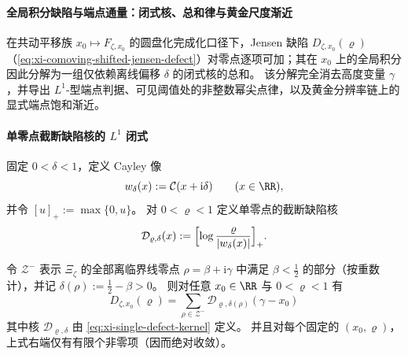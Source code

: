 \paragraph{全局积分缺陷与端点通量：闭式核、总和律与黄金尺度渐近}\label{par:xi-comoving-integrated-jensen-defect-sumrule}
在共动平移族 \(x_0\mapsto F_{\zeta,x_0}\) 的圆盘化完成化口径下，Jensen 缺陷 \(D_{\zeta,x_0}(\varrho)\)（\eqref{eq:xi-comoving-shifted-jensen-defect}）对零点逐项可加；其在 \(x_0\) 上的全局积分因此分解为一组仅依赖离线偏移 \(\delta\) 的闭式核的总和。
该分解完全消去高度变量 \(\gamma\)，并导出 \(L^1\)-型端点判据、可见阈值处的非整数幂尖点律，以及黄金分辨率链上的显式端点饱和渐近。

\paragraph{单零点截断缺陷核的 \texorpdfstring{$L^1$}{L1} 闭式}
固定 \(0<\delta<1\)，定义 Cayley 像
\[
w_\delta(x):=\mathcal{C}(x+\mathrm{i}\delta)\qquad(x\in\RR),
\]
并令 \([u]_+:=\max\{0,u\}\)。
对 \(0<\varrho<1\) 定义单零点的截断缺陷核
\begin{equation}\label{eq:xi-single-defect-kernel}
\mathcal{D}_{\varrho,\delta}(x):=\Bigl[\log\frac{\varrho}{|w_\delta(x)|}\Bigr]_+.
\end{equation}

\begin{theorem}\label{thm:xi-comoving-jensen-defect-kernel-decomposition}
令 \(\mathcal{Z}^-\) 表示 \(\Xi_{\zeta}\) 的全部离临界线零点 \(\rho=\beta+\mathrm{i}\gamma\) 中满足 \(\beta<\tfrac12\) 的部分（按重数计），并记
\(
\delta(\rho):=\tfrac12-\beta>0
\)。
则对任意 \(x_0\in\RR\) 与 \(0<\varrho<1\) 有
\begin{equation}\label{eq:xi-comoving-jensen-defect-kernel-decomposition}
\boxed{\;
D_{\zeta,x_0}(\varrho)
=\sum_{\rho\in\mathcal{Z}^-}\mathcal{D}_{\varrho,\delta(\rho)}(\gamma-x_0)\;}
\end{equation}
其中核 \(\mathcal{D}_{\varrho,\delta}\) 由 \eqref{eq:xi-single-defect-kernel} 定义。
并且对每个固定的 \((x_0,\varrho)\)，上式右端仅有有限个非零项（因而绝对收敛）。
\end{theorem}

